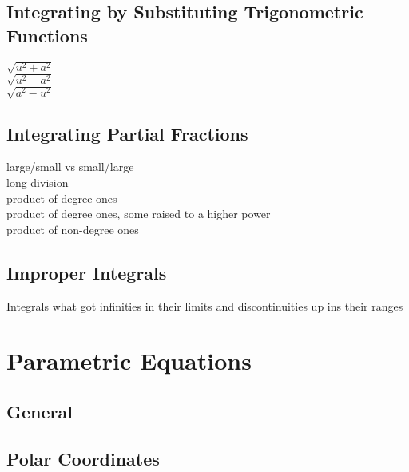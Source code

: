 \documentclass[letterpaper,normalheadings,twocolumn]{scrreprt}
\begin{document}
\section{Integrating by Substituting Trigonometric Functions}%

$\sqrt{u^2 + a^2}$\\
$\sqrt{u^2 - a^2}$\\
$\sqrt{a^2 - u^2}$\\


\section{Integrating Partial Fractions}%
large/small vs small/large\\
long division\\
product of degree ones\\
product of degree ones, some raised to a higher power\\
product of non-degree ones\\

\section{Improper Integrals}%
Integrals what got infinities in their limits and discontinuities up ins their ranges

\chapter{Parametric Equations}

\section{General}%


\section{Polar Coordinates}%
\end{document}
